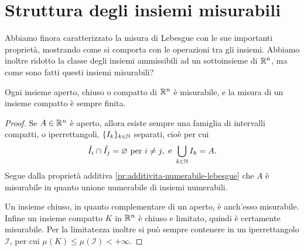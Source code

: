 \section{Struttura degli insiemi misurabili}
\label{sec:struttura-insiemi-misurabili}
Abbiamo finora caratterizzato la misura di Lebesgue con le sue importanti proprietà, mostrando come si comporta con le operazioni tra gli insiemi.
Abbiamo inoltre ridotto la classe degli insiemi ammissibili ad un sottoinsieme di $\mathbb{R}^n$, ma come sono fatti questi insiemi misurabili?
\begin{teorema}
	Ogni insieme aperto, chiuso o compatto di $\mathbb{R}^n$ è misurabile, e la misura di un insieme compatto è sempre finita.
\end{teorema}
\begin{proof}
	Se $A\in\mathbb{R}^n$ è aperto, allora esiste sempre una famiglia di intervalli compatti, o iperrettangoli, $\{I_k\}_{k\in\mathbb{N}}$ separati, cioè per cui
	\begin{equation*}
		\mathring{I_i}\cap\mathring{I_j}=\varnothing\text{ per }i\neq j,\text{ e }\bigcup_{k\in\mathbb{N}}I_k=A.
	\end{equation*}
	Segue dalla proprietà additiva \ref{pr:additivita-numerabile-lebesgue} che $A$ è misurabile in quanto unione numerabile di insiemi numerabili.

	Un insieme chiuso, in quanto complementare di un aperto, è anch'esso misurabile.
	Infine un insieme compatto $K$ in $\mathbb{R}^n$ è chiuso e limitato, quindi è certamente misurabile.
	Per la limitatezza inoltre si può sempre contenere in un iperrettangolo $\mathcal I$, per cui $\mu(K)\leq\mu(\mathcal I)<+\infty$.
\end{proof}

